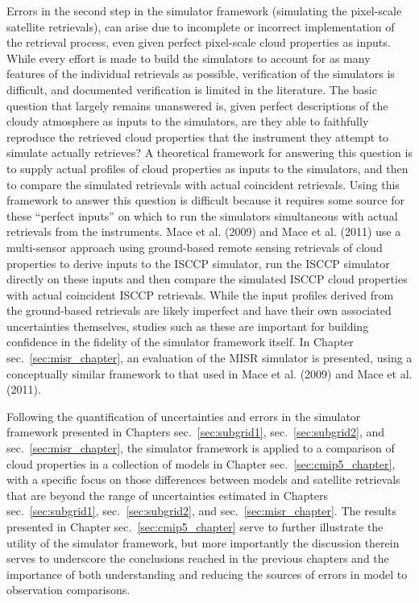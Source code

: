 Errors in the second step in the simulator framework (simulating the
pixel-scale satellite retrievals), can arise due to incomplete or
incorrect implementation of the retrieval process, even given perfect
pixel-scale cloud properties as inputs. While every effort is made to
build the simulators to account for as many features of the individual
retrievals as possible, verification of the simulators is difficult, and
documented verification is limited in the literature. The basic question
that largely remains unanswered is, given perfect descriptions of the
cloudy atmosphere as inputs to the simulators, are they able to
faithfully reproduce the retrieved cloud properties that the instrument
they attempt to simulate actually retrieves? A theoretical framework for
answering this question is to supply actual profiles of cloud properties
as inputs to the simulators, and then to compare the simulated
retrievals with actual coincident retrievals. Using this framework to
answer this question is difficult because it requires some source for
these ``perfect inputs'' on which to run the simulators simultaneous
with actual retrievals from the instruments. Mace et al. (2009) and Mace
et al. (2011) use a multi-sensor approach using ground-based remote
sensing retrievals of cloud properties to derive inputs to the ISCCP
simulator, run the ISCCP simulator directly on these inputs and then
compare the simulated ISCCP cloud properties with actual coincident
ISCCP retrievals. While the input profiles derived from the ground-based
retrievals are likely imperfect and have their own associated
uncertainties themselves, studies such as these are important for
building confidence in the fidelity of the simulator framework itself.
In Chapter sec.~\ref{sec:misr_chapter}, an evaluation of the MISR
simulator is presented, using a conceptually similar framework to that
used in Mace et al. (2009) and Mace et al. (2011).

Following the quantification of uncertainties and errors in the
simulator framework presented in Chapters sec.~\ref{sec:subgrid1},
sec.~\ref{sec:subgrid2}, and sec.~\ref{sec:misr_chapter}, the simulator
framework is applied to a comparison of cloud properties in a collection
of models in Chapter sec.~\ref{sec:cmip5_chapter}, with a specific focus
on those differences between models and satellite retrievals that are
beyond the range of uncertainties estimated in Chapters
sec.~\ref{sec:subgrid1}, sec.~\ref{sec:subgrid2}, and
sec.~\ref{sec:misr_chapter}. The results presented in Chapter
sec.~\ref{sec:cmip5_chapter} serve to further illustrate the utility of
the simulator framework, but more importantly the discussion therein
serves to underscore the conclusions reached in the previous chapters
and the importance of both understanding and reducing the sources of
errors in model to observation comparisons.

